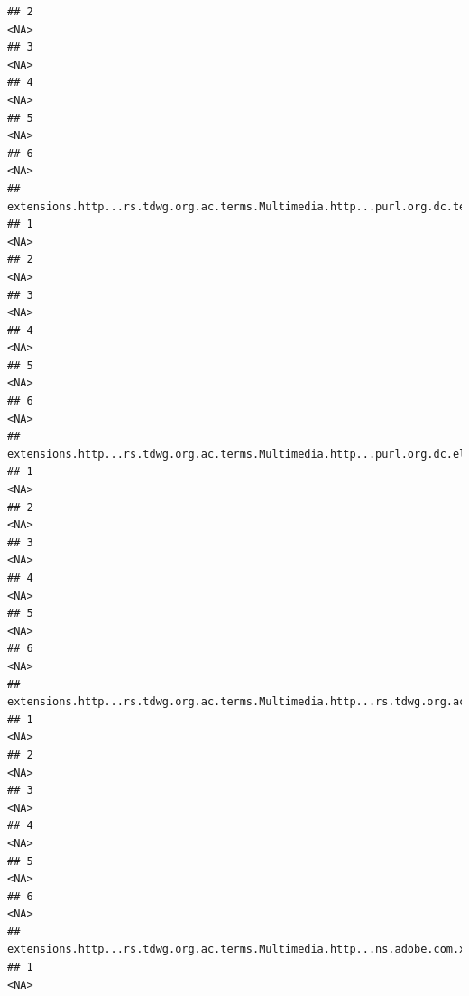 \documentclass[
]{book}
\begin{document}
\begin{verbatim}
## 2                                                                                       <NA>
## 3                                                                                       <NA>
## 4                                                                                       <NA>
## 5                                                                                       <NA>
## 6                                                                                       <NA>
##   extensions.http...rs.tdwg.org.ac.terms.Multimedia.http...purl.org.dc.terms.creator.1
## 1                                                                                 <NA>
## 2                                                                                 <NA>
## 3                                                                                 <NA>
## 4                                                                                 <NA>
## 5                                                                                 <NA>
## 6                                                                                 <NA>
##   extensions.http...rs.tdwg.org.ac.terms.Multimedia.http...purl.org.dc.elements.1.1.rights.1
## 1                                                                                       <NA>
## 2                                                                                       <NA>
## 3                                                                                       <NA>
## 4                                                                                       <NA>
## 5                                                                                       <NA>
## 6                                                                                       <NA>
##   extensions.http...rs.tdwg.org.ac.terms.Multimedia.http...rs.tdwg.org.ac.terms.tag.1
## 1                                                                                <NA>
## 2                                                                                <NA>
## 3                                                                                <NA>
## 4                                                                                <NA>
## 5                                                                                <NA>
## 6                                                                                <NA>
##   extensions.http...rs.tdwg.org.ac.terms.Multimedia.http...ns.adobe.com.xap.1.0.rights.Owner.1
## 1                                                                                         <NA>

\end{verbatim}
\end{document}
